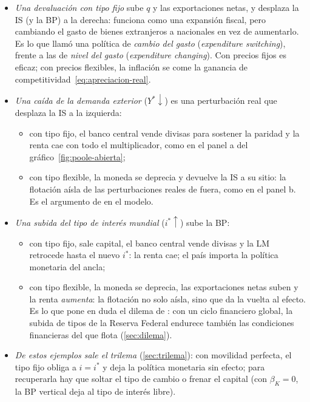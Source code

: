 \documentclass[11pt]{article}
\begin{document}
\begin{itemize}
\item \emph{Una devaluación con tipo fijo} sube $q$ y las exportaciones netas, y desplaza la IS (y la BP) a la derecha: funciona como una expansión fiscal, pero cambiando el gasto de bienes extranjeros a nacionales en vez de aumentarlo. Es lo que \textcite{Meade1951} llamó una política de \emph{cambio del gasto} (\emph{expenditure switching}), frente a las de \emph{nivel del gasto} (\emph{expenditure changing}). Con precios fijos es eficaz; con precios flexibles, la inflación se come la ganancia de competitividad~\eqref{eq:apreciacion-real}.
\item \emph{Una caída de la demanda exterior} ($Y^*\downarrow$) es una perturbación real que desplaza la IS a la izquierda:
  \begin{itemize}
  \item con tipo fijo, el banco central vende divisas para sostener la paridad y la renta cae con todo el multiplicador, como en el panel a del gráfico~\ref{fig:poole-abierta};
  \item con tipo flexible, la moneda se deprecia y devuelve la IS a su sitio: la flotación aísla de las perturbaciones reales de fuera, como en el panel b. Es el argumento de \textcite{Friedman1953Case} en el modelo.
  \end{itemize}
\item \emph{Una subida del tipo de interés mundial} ($i^*\uparrow$) sube la BP:
  \begin{itemize}
  \item con tipo fijo, sale capital, el banco central vende divisas y la LM retrocede hasta el nuevo $i^*$: la renta cae; el país importa la política monetaria del ancla;
  \item con tipo flexible, la moneda se deprecia, las exportaciones netas suben y la renta \emph{aumenta}: la flotación no solo aísla, sino que da la vuelta al efecto. Es lo que pone en duda el dilema de \textcite{Rey2013Dilema}: con un ciclo financiero global, la subida de tipos de la Reserva Federal endurece también las condiciones financieras del que flota (\ref{sec:dilema}).
  \end{itemize}
\item \emph{De estos ejemplos sale el trilema} (\ref{sec:trilema}): con movilidad perfecta, el tipo fijo obliga a $i=i^*$ y deja la política monetaria sin efecto; para recuperarla hay que soltar el tipo de cambio o frenar el capital (con $\beta_K=0$, la BP vertical deja al tipo de interés libre).
\end{itemize}
\end{document}

